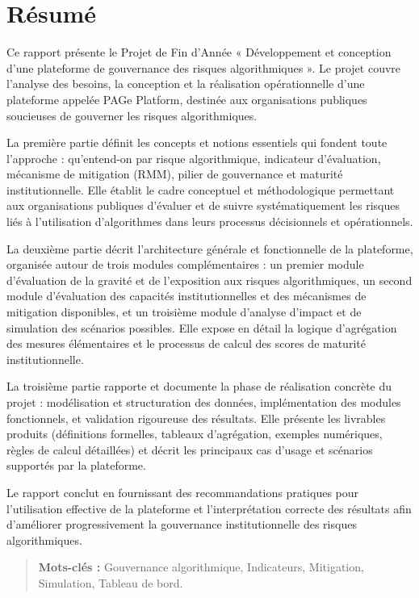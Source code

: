 \chapter*{Résumé}
Ce rapport présente le Projet de Fin d'Année « Développement et conception d'une plateforme de gouvernance des risques algorithmiques ». Le projet couvre l'analyse des besoins, la conception et la réalisation opérationnelle d'une plateforme appelée PAGe Platform, destinée aux organisations publiques soucieuses de gouverner les risques algorithmiques.

La première partie définit les concepts et notions essentiels qui fondent toute l'approche : qu'entend-on par risque algorithmique, indicateur d'évaluation, mécanisme de mitigation (RMM), pilier de gouvernance et maturité institutionnelle. Elle établit le cadre conceptuel et méthodologique permettant aux organisations publiques d'évaluer et de suivre systématiquement les risques liés à l'utilisation d'algorithmes dans leurs processus décisionnels et opérationnels.

La deuxième partie décrit l'architecture générale et fonctionnelle de la plateforme, organisée autour de trois modules complémentaires : un premier module d'évaluation de la gravité et de l'exposition aux risques algorithmiques, un second module d'évaluation des capacités institutionnelles et des mécanismes de mitigation disponibles, et un troisième module d'analyse d'impact et de simulation des scénarios possibles. Elle expose en détail la logique d'agrégation des mesures élémentaires et le processus de calcul des scores de maturité institutionnelle.

La troisième partie rapporte et documente la phase de réalisation concrète du projet : modélisation et structuration des données, implémentation des modules fonctionnels, et validation rigoureuse des résultats. Elle présente les livrables produits (définitions formelles, tableaux d'agrégation, exemples numériques, règles de calcul détaillées) et décrit les principaux cas d'usage et scénarios supportés par la plateforme.

Le rapport conclut en fournissant des recommandations pratiques pour l'utilisation effective de la plateforme et l'interprétation correcte des résultats afin d'améliorer progressivement la gouvernance institutionnelle des risques algorithmiques.
\vspace{6cm}
\begin{quote}
\textbf{Mots-clés :} Gouvernance algorithmique, Indicateurs, Mitigation, Simulation, Tableau de bord.
\end{quote}